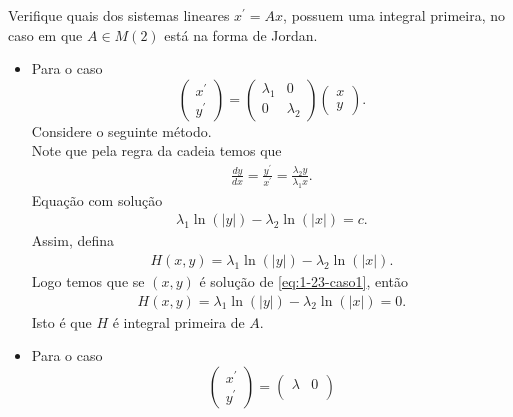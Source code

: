 \begin{homeworkProblem}[1-23]
  Verifique quais dos sistemas lineares $x^{\prime}=Ax$, possuem uma integral primeira, no caso em que $A\in M(2)$ está na forma de Jordan. 
  \begin{solution}
  \begin{itemize}
    \item Para o caso
      \begin{equation}\label{eq:1-23-caso1}
        \begin{pmatrix}
          x^{\prime} \\
          y^{\prime}
        \end{pmatrix}=\begin{pmatrix}
          \lambda_1 & 0 \\
          0 & \lambda_2
        \end{pmatrix}\begin{pmatrix}
          x \\
          y
        \end{pmatrix}.
      \end{equation}
      Considere o seguinte método.\\
      Note que pela regra da cadeia temos que
      \begin{align*}
        \frac{dy}{dx}=\frac{y^{\prime}}{x^{\prime}}=\frac{\lambda_2y}{\lambda_1x}.
      \end{align*}
      Equação com solução
      \begin{align*}
        \lambda_1\ln(|y|)-\lambda_2\ln(|x|)=c.
      \end{align*}
      Assim, defina
      \begin{align*}
        H(x,y)=\lambda_1\ln(|y|)-\lambda_2\ln(|x|).
      \end{align*}
      Logo temos que se $(x,y)$ é solução de \eqref{eq:1-23-caso1}, então
      \begin{align*}
        H(x,y)=\lambda_1\ln(|y|)-\lambda_2\ln(|x|)=0.
      \end{align*}
      Isto é que $H$ é integral primeira de $A$.
    \item Para o caso
      \begin{equation}\label{eq:1-23-caso2}
        \begin{pmatrix}
          x^{\prime} \\
          y^{\prime}
        \end{pmatrix}=\begin{pmatrix}
          \lambda & 0 \\

\end{pmatrix}
\end{equation}
\end{itemize}
\end{solution}
\end{homeworkProblem}
